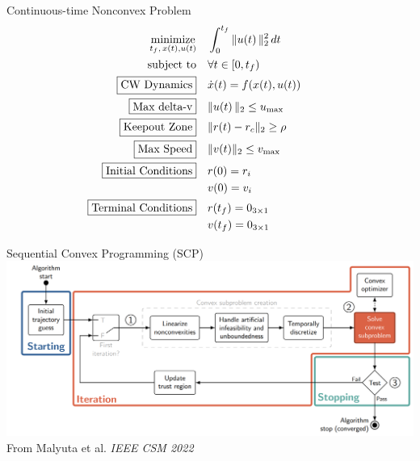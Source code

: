 \documentclass[aspectratio=169]{beamer}
\newcommand{\f}[2]{#1\!\left(#2\right)} %
\begin{document}
\begin{frame}{Continuous-time Nonconvex Problem}
    \begin{equation*}
            \begin{aligned}
            \underset{t_{f},\,{x}(t), {u}(t)}{\text{minimize}} &
            && \int_{0}^{t_f} \|\f{u}{t}\|_2^2 \,dt \\
            \text{subject to} &
            && \forall t \in [0, t_f) \\
            \fbox{\text{CW Dynamics}} &&& {\f{\dot{{x}}}{t}} = \f{f}{{\f{{x}}{t}}, {\f{{u}}{t}}} \\
            \fbox{\text{Max delta-v}} &&& \|\f{u}{t}\|_2 \le u_{\max}\\
            \fbox{\text{Keepout Zone}} &&& 
            \|{r}(t)-r_c\|_2 \geq \rho \hphantom{\qquad\qquad} \\
            \fbox{\text{Max Speed}}
            &&& \|{v}(t)\|_2 \leq v_{\mathrm{max}} \\
            \fbox{\text{Initial Conditions}}
            &&& {r}(0) = {r}_i \\
            &&& {v}(0) = {v}_i \\
            \fbox{\text{Terminal Conditions}}
            &&& {r}(t_f) = {0}_{3 \times 1} \\
            &&& {v}(t_f) = {0}_{3 \times 1} \\
            \end{aligned}
        \end{equation*}
\end{frame}
\begin{frame}{Sequential Convex Programming (SCP)}
    \includegraphics[width=\linewidth]{img/scp_block_diagram_csm.png}
    {\footnotesize \color{gray} From Malyuta et al. \emph{IEEE CSM 2022}}    
\end{frame}
\end{document}
